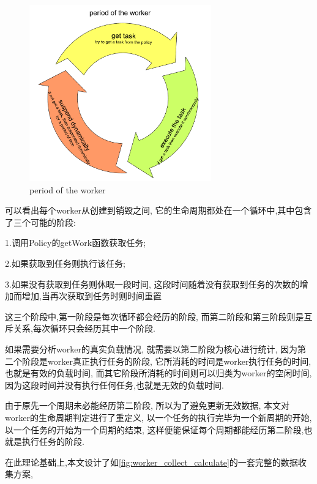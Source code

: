 \documentclass{mproj}
\begin{document}
\begin{figure}[h]
    \centering %
    \includegraphics[width=0.7\textwidth]{images/period_of_worker.pdf} %
    \caption{period of the worker} %
    \label{fig:period_of_worker} %
\end{figure}
\FloatBarrier

可以看出每个worker从创建到销毁之间,
它的生命周期都处在一个循环中,其中包含了三个可能的阶段:

1.调用Policy的getWork函数获取任务;

2.如果获取到任务则执行该任务;

3.如果没有获取到任务则休眠一段时间,
这段时间随着没有获取到任务的次数的增加而增加,当再次获取到任务时则时间重置

这三个阶段中,第一阶段是每次循环都会经历的阶段,
而第二阶段和第三阶段则是互斥关系,每次循环只会经历其中一个阶段.

如果需要分析worker的真实负载情况,
就需要以第二阶段为核心进行统计,
因为第二个阶段是worker真正执行任务的阶段,
它所消耗的时间是worker执行任务的时间,也就是有效的负载时间,
而其它阶段所消耗的时间则可以归类为worker的空闲时间,
因为这段时间并没有执行任何任务,也就是无效的负载时间.

由于原先一个周期未必能经历第二阶段,
所以为了避免更新无效数据,
本文对worker的生命周期判定进行了重定义,
以一个任务的执行完毕为一个新周期的开始,
以一个任务的开始为一个周期的结束,
这样便能保证每个周期都能经历第二阶段,也就是执行任务的阶段.

在此理论基础上,本文设计了如\cref{fig:worker_collect_calculate}的一套完整的数据收集方案,
\end{document}
